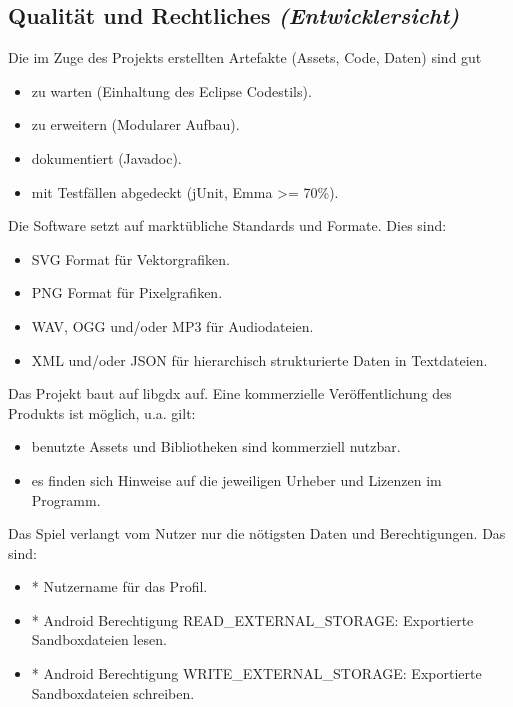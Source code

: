 \subsection{Qualität und Rechtliches \textit{(Entwicklersicht)}}
\begin{requirements}
	 Die im Zuge des Projekts erstellten Artefakte (Assets, Code, Daten) sind gut
		\begin{itemize}
			\item zu warten (Einhaltung des Eclipse Codestils).
			\item zu erweitern (Modularer Aufbau).
			\item dokumentiert (Javadoc).
			\item mit Testfällen abgedeckt (jUnit, Emma >= 70\%).
		\end{itemize}
	 Die Software setzt auf marktübliche Standards und Formate. Dies sind:
		\begin{itemize}
			\item SVG Format für Vektorgrafiken.
			\item PNG Format für Pixelgrafiken.
			\item WAV, OGG und/oder MP3 für Audiodateien.
			\item XML und/oder JSON für hierarchisch strukturierte Daten in Textdateien.
		\end{itemize}
	 Das Projekt baut auf libgdx auf.
	 Eine kommerzielle Veröffentlichung des Produkts ist möglich, u.a. gilt:
		\begin{itemize}
			\item benutzte Assets und Bibliotheken sind kommerziell nutzbar.
			\item es finden sich Hinweise auf die jeweiligen Urheber und Lizenzen im Programm.
		\end{itemize}
	 Das Spiel verlangt vom Nutzer nur die nötigsten Daten und Berechtigungen. Das sind:
		\begin{itemize}
			\item * Nutzername für das Profil.
			\item * Android Berechtigung READ\_EXTERNAL\_STORAGE: Exportierte Sandboxdateien lesen.
			\item * Android Berechtigung WRITE\_EXTERNAL\_STORAGE: Exportierte Sandboxdateien schreiben.
		\end{itemize}
\end{requirements}

